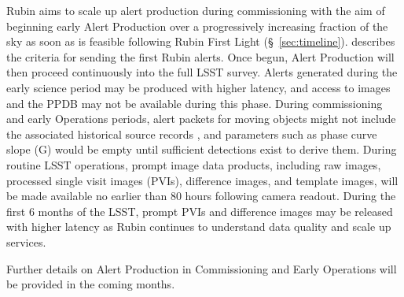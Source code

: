 Rubin aims to scale up alert production during commissioning with the aim of beginning early Alert Production over a progressively increasing fraction of the sky as soon as is feasible following Rubin First Light  (\S~\ref{sec:timeline}).
 describes the criteria for sending the first Rubin alerts.
Once begun, Alert Production will then proceed continuously into the full LSST survey.
Alerts generated during the early science period may be produced with higher latency, and access to images and the PPDB may not be available during this phase.
During  commissioning and early Operations periods,  alert packets for moving objects might not include the associated historical source records , and parameters such as phase curve slope (G) would be empty until sufficient detections exist to derive them.
During routine LSST operations, prompt image data products, including  raw images, processed single visit images (PVIs), difference images, and template images, will be made available no earlier than 80 hours following camera readout.
During the first 6 months of the LSST,  prompt PVIs and difference images may be released with higher latency as Rubin continues to understand data quality and scale up services.

Further details on Alert Production in Commissioning and Early Operations will be provided in the coming months.


%
